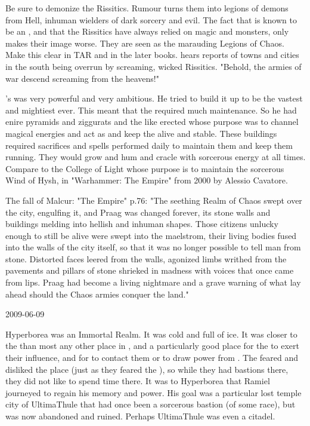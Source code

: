 Be sure to demonize the Rissitics. 
Rumour turns them into legions of demons from Hell, inhuman wielders of dark sorcery and evil.
The fact that \Narkiza is known to be an \Ashenoch, and that the Rissitics have always relied on magic and monsters, only makes their image worse.
They are seen as the marauding Legions of Chaos.
Make this clear in TAR and in the later books.
\Tiroco hears reports of towns and cities in the south being overrun by screaming, wicked Rissitics.
"Behold, the armies of war descend screaming from the heavens!"

\Secherdamon's \matrix was very powerful and very ambitious.
He tried to build it up to be the vastest and mightiest \matrix ever.
This meant that the \matrix required much maintenance.
So he had enire pyramids and ziggurats and the like erected whose purpose was to channel magical energies and act as \nexi and keep the \matrix alive and stable.
These buildings required sacrifices and spells performed daily to maintain them and keep them running.
They would grow and hum and cracle with sorcerous energy at all times.
Compare to the College of Light whose purpose is to maintain the sorcerous Wind of Hysh, in "Warhammer: The Empire" from 2000 by Alessio Cavatore. 

The fall of Malcur: "The Empire" p.76:
"The seething Realm of Chaos swept over the city, engulfing it, and Praag was changed forever, its stone walls and buildings melding into hellish and inhuman shapes. Those citizens unlucky enough to still be alive were swept into the maelstrom, their living bodies fused into the walls of the city itself, so that it was no longer possible to tell man from stone. Distorted faces leered from the walls, agonized limbs writhed from the pavements and pillars of stone shrieked in madness with voices that once came from \human lips. Praag had become a living nightmare and a grave warning of what lay ahead should the Chaos armies conquer the land."



2009-06-09

Hyperborea was an Immortal Realm. 
It was cold and full of ice.
It was closer to the \CrystalSphere than most any other place in \Miith, and a particularly good place for the \banelords to exert their influence, and for \Miithians to contact them or to draw power from \Erebos.
The \resphain feared and disliked the place (just as they feared the \banelords), so while they had bastions there, they did not like to spend time there. 
It was to Hyperborea that Ramiel journeyed to regain his memory and power. 
His goal was a particular lost temple city of UltimaThule that had once been a sorcerous bastion (of some race), but was now abandoned and ruined.
Perhaps UltimaThule was even a \voyager citadel.

